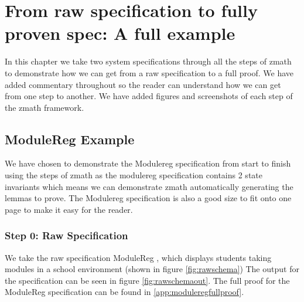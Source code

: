 \chapter{From raw specification to fully proven spec: A full example}
\label{ch:fullexample}

In this chapter we take two system specifications through all the steps of
\gls{zmath} to demonstrate how we can get from a raw specification to a full
proof. We have added commentary throughout so the reader can understand how we
can get from one step to another. We have added figures and screenshots of each
step of the \gls{zmath} framework.

\section{ModuleReg Example}
We have chosen to demonstrate the Modulereg specification from start to finish
using the steps of \gls{zmath} as the modulereg specification contains 2 state
invariants which means we can demonstrate \gls{zmath} automatically generating
the lemmas to prove. The  Modulereg specification is also a good size to fit
onto one page to make it easy for the reader.

\subsection{Step 0: Raw Specification}
We take the raw specification ModuleReg \cite{essenceofz}, which displays students
taking modules in a school environment (shown in figure \ref{fig:rawschema}) The
output for the specification can be seen in figure \ref{fig:rawschemaout}. The
full proof for the ModuleReg specification can be found in \ref{app:moduleregfullproof}.

